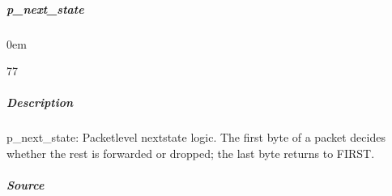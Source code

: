 \documentclass[letterpaper,10pt,english]{sphinxmanual}
\begin{document}
\sphinxstepscope


\subparagraph{p\_next\_state}
\label{\detokenize{modules/stream_filter/processes/p_next_state:p-next-state}}\label{\detokenize{modules/stream_filter/processes/p_next_state::doc}}
\begin{DUlineblock}{0em}
\item[]  
\item[]  77
\item[]  
\item[]  \sphinxcode{\sphinxupquote{*}}
\end{DUlineblock}


\subparagraph{Description}
\label{\detokenize{modules/stream_filter/processes/p_next_state:description}}
\sphinxAtStartPar
p\_next\_state: Packet\sphinxhyphen{}level next\sphinxhyphen{}state logic.
The first byte of a packet decides whether the rest is forwarded or
dropped; the last byte returns to FIRST.


\subparagraph{Source}
\label{\detokenize{modules/stream_filter/processes/p_next_state:source}}
\begin{sphinxVerbatim}[commandchars=\\\{\}]
\end{sphinxVerbatim}
\end{document}
